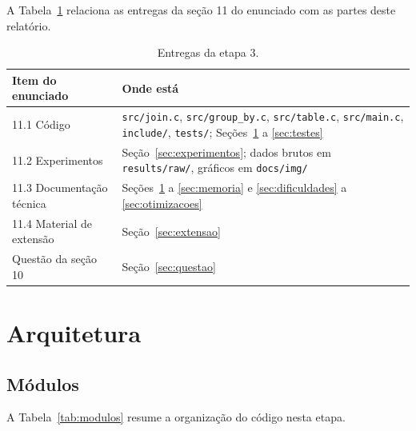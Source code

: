 \documentclass[11pt,a4paper]{article}
\begin{document}
A Tabela~\ref{tab:entregas} relaciona as entregas da seção 11 do enunciado com as partes deste relatório.

\begin{table}[H]
\centering
\small
\begin{tabular}{@{}p{5.0cm}p{11.4cm}@{}}
\toprule
Item do enunciado & Onde está \\
\midrule
11.1 Código & \texttt{src/join.c}, \texttt{src/group\_by.c}, \texttt{src/table.c}, \texttt{src/main.c}, \texttt{include/}, \texttt{tests/}; Seções~\ref{sec:arquitetura} a \ref{sec:testes} \\
11.2 Experimentos & Seção~\ref{sec:experimentos}; dados brutos em \texttt{results/raw/}, gráficos em \texttt{docs/img/} \\
11.3 Documentação técnica & Seções~\ref{sec:arquitetura} a \ref{sec:memoria} e \ref{sec:dificuldades} a \ref{sec:otimizacoes} \\
11.4 Material de extensão & Seção~\ref{sec:extensao} \\
Questão da seção 10 & Seção~\ref{sec:questao} \\
\bottomrule
\end{tabular}
\caption{Entregas da etapa 3.}
\label{tab:entregas}
\end{table}

\section{Arquitetura}\label{sec:arquitetura}

\subsection{Módulos}
A Tabela~\ref{tab:modulos} resume a organização do código nesta etapa.
\end{document}
